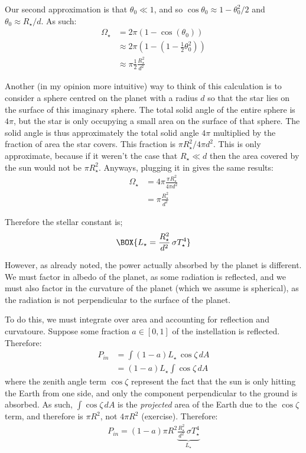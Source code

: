 Our second approximation is that $\theta_0\ll 1$, and so $\cos\theta_0\approx 1-\theta_0^2/2$ and $\theta_0\approx R_\star/d$. As such:
\begin{align*}
    \Omega_\star&=2\pi (1-\cos(\theta_0))\\
    &\approx 2\pi \left( 1-\left( 1-\frac{1}{2}\theta_0^2 \right) \right)\\
    &\approx\pi \frac{1}{2}\frac{R_\star^2}{d^2}
\end{align*}

Another (in my opinion more intuitive) way to think of this calculation is to consider a sphere centred on the planet with a radius $d$ so that the star lies on the surface of this imaginary sphere. The total solid angle of the entire sphere is $4\pi$, but the star is only occupying a small area on the surface of that sphere. The solid angle is thus approximately the total solid angle $4\pi$ multiplied by the fraction of area the star covers. This fraction is $\pi R_{\star}^2/4\pi d^2$. This is only approximate, because if it weren't the case that $R_\star\ll d$ then the area covered by the sun would not be $\pi R_{\star}^2$. Anyways, plugging it in gives the same results:
\begin{align*}
    \Omega_{\star}&=4\pi\frac{\pi R_{\star}^2}{4\pi d^2}\\
    &=\pi \frac{R_{\star}^2}{d^2}
\end{align*}

Therefore the stellar constant is;
\begin{align}
    \BOX{
    L_{\star}=\frac{R_{\star}^2}{d^2}\,\sigma T_{\star}^4}
\end{align}

However, as already noted, the power actually absorbed by the planet is different. We must factor in albedo of the planet, as some radiation is reflected, and we must also factor in the curvature of the planet (which we assume is spherical), as the radiation is not perpendicular to the surface of the planet.

To do this, we must integrate over area and accounting for reflection and curvatoure. Suppose some fraction $a\in[0,1]$ of the instellation is reflected. Therefore:
\begin{align*}
    P_{in}&=\int (1-a)L_\star \,\cos \zeta\,dA\\
    &=(1-a)L_\star\int \cos \zeta\,dA
\end{align*}
where the zenith angle term $\cos \zeta$ represent the fact that the sun is only hitting the Earth from one side, and only the component perpendicular to the ground is absorbed. As such, $\int\cos\zeta\, dA$ is the \textit{projected} area of the Earth due to the $\cos \zeta$ term, and therefore is $\pi R^2$, not $4\pi R^2$ (exercise). Therefore:
\begin{align}
    P_{in} = (1-a)\pi R^2 \underbrace{\frac{R_{\star}^2}{d^2}\,\sigma T_{\star}^4}_{L_\star}
\end{align}

